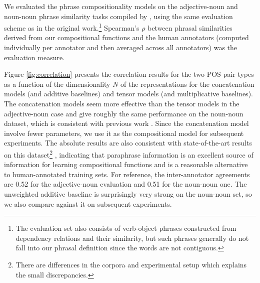 \documentclass[11pt,letterpaper]{article}
\begin{document}
We evaluated the phrase compositionality models on the adjective-noun and noun-noun phrase similarity tasks compiled by , using the same evaluation scheme as in the original work.\footnote{The evaluation set also consists of verb-object phrases constructed from dependency relations and their similarity, but such phrases generally do not fall into our phrasal definition since the words are not contiguous.}
Spearman's $\rho$ between phrasal similarities derived from our compositional functions and the human annotators (computed individually per annotator and then averaged across all annotators) was the evaluation measure. 

Figure \ref{fig:correlation} presents the correlation results for the two POS pair types as a function of the dimensionality $N$ of the representations for the concatenation models (and additive baselines) and tensor models (and multiplicative baselines). 
The concatenation models seem more effective than the tensor models in the adjective-noun case and give roughly the same performance on the noun-noun dataset, which is consistent with previous work \cite{Guevara2011}. 
Since the concatenation model involve fewer parameters, we use it as the compositional model for subsequent experiments. 
The absolute results are also consistent with state-of-the-art results on this dataset\footnote{There are differences in the corpora and experimental setup which explains the small discrepancies.} \cite{Blacoe2012}, indicating that paraphrase information is an excellent source of information for learning compositional functions and is a reasonable alternative to human-annotated training sets. 
For reference, the inter-annotator agreements are 0.52 for the adjective-noun evaluation and 0.51 for the noun-noun one. 
The unweighted additive baseline is surprisingly very strong on the noun-noun set, so we also compare against it on subsequent experiments. 

\end{document}
